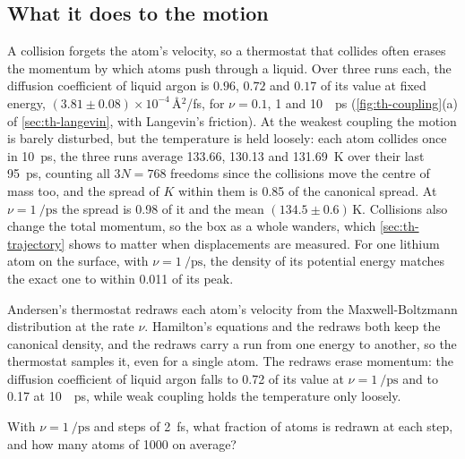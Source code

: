 \subsection*{What it does to the motion}

A collision forgets the atom's velocity, so a thermostat that collides
often erases the momentum by which atoms push through a liquid. Over three
runs each, the diffusion coefficient of liquid argon is $0.96$, $0.72$ and
$0.17$ of its value at fixed energy, $(3.81 \pm 0.08)\times10^{-4}$\,\AA$^2$/fs,
for $\nu = 0.1$, 1 and \SI{10}{\per\pico\second}
(\cref{fig:th-coupling}(a) of \cref{sec:th-langevin}, with Langevin's
friction). At the weakest coupling the motion is barely disturbed, but
the temperature is held loosely: each atom collides once in
\SI{10}{\pico\second}, the three runs average 133.66, 130.13 and
\SI{131.69}{\kelvin} over their last \SI{95}{\pico\second}, counting all
$3N = 768$ freedoms since the collisions move the centre of mass too, and
the spread of $K$ within them is 0.85 of the canonical spread. At $\nu =
\SI{1}{\per\pico\second}$ the spread is 0.98 of it and the mean
$(134.5 \pm 0.6)$\,\si{\kelvin}. Collisions also change the total momentum, so
the box as a whole wanders, which \cref{sec:th-trajectory} shows to
matter when displacements are measured. For one lithium atom on the
surface, with $\nu = \SI{1}{\per\pico\second}$, the density of its
potential energy matches the exact one to within 0.011 of its peak.

\begin{keyidea}
Andersen's thermostat redraws each atom's velocity from the
Maxwell-Boltzmann distribution at the rate $\nu$. Hamilton's equations
and the redraws both keep the canonical density, and the redraws carry a
run from one energy to another, so the thermostat samples it, even for a
single atom. The redraws erase momentum: the
diffusion coefficient of liquid argon falls to 0.72 of its value at
$\nu = \SI{1}{\per\pico\second}$ and to 0.17 at
\SI{10}{\per\pico\second}, while weak coupling holds the temperature
only loosely.
\end{keyidea}

\begin{selfcheck}
With $\nu = \SI{1}{\per\pico\second}$ and steps of
\SI{2}{\femto\second}, what fraction of atoms is redrawn at each step, and
how many atoms of 1000 on average?
\end{selfcheck}
